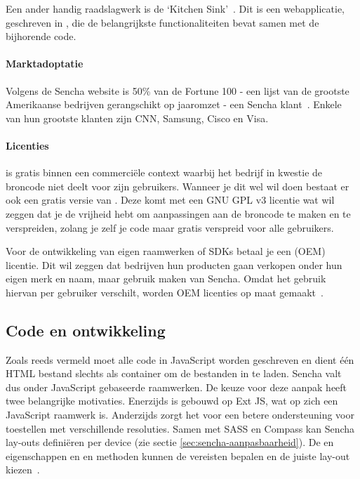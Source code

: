 Een ander handig raadslagwerk is de ‘Kitchen Sink'~\cite{Inc.2013}.  
Dit is een webapplicatie,  geschreven in \st{},  die de belangrijkste functionaliteiten bevat samen met de bijhorende code.  

\paragraph{Marktadoptatie}
Volgens de Sencha website is 50\% van de Fortune 100 - een lijst van de grootste Amerikaanse bedrijven gerangschikt op jaaromzet - een Sencha klant~\cite{Inc.}.  
Enkele van hun grootste klanten zijn CNN,  Samsung,  Cisco en  Visa.

\paragraph{Licenties}
\st{} is gratis binnen een commerciële context waarbij het bedrijf in kwestie de broncode niet deelt voor zijn gebruikers.  
Wanneer je dit wel wil doen bestaat er ook een gratis  versie van \st{}.  
Deze komt met een GNU GPL v3  licentie wat wil zeggen dat je de vrijheid hebt om aanpassingen aan de broncode te maken en te verspreiden,  zolang je zelf je code maar gratis verspreid voor alle gebruikers.
  
Voor de ontwikkeling van eigen raamwerken of SDKs betaal je een  (OEM) licentie.  
Dit wil zeggen dat bedrijven hun producten gaan verkopen onder hun eigen merk en naam, maar gebruik maken van Sencha.  
Omdat het gebruik hiervan per gebruiker verschilt,  worden OEM licenties op maat gemaakt~\cite{Inc.}.

\subsection{Code en ontwikkeling}
Zoals reeds vermeld moet alle code in JavaScript worden geschreven en dient één HTML bestand slechts als container om de bestanden in te laden.  Sencha valt dus onder JavaScript gebaseerde raamwerken.  
De keuze voor deze aanpak heeft twee belangrijke motivaties.  
Enerzijds is \st{} gebouwd op Ext JS,  wat op zich een JavaScript raamwerk is.  
Anderzijds zorgt het voor een betere ondersteuning voor toestellen met verschillende resoluties.  
Samen met SASS en Compass kan Sencha lay-outs definiëren per device (zie sectie \ref{sec:sencha-aanpasbaarheid}).  
De  en  eigenschappen en  en  methoden kunnen de vereisten bepalen en de juiste lay-out kiezen~\cite{JohnEClark2012}.

